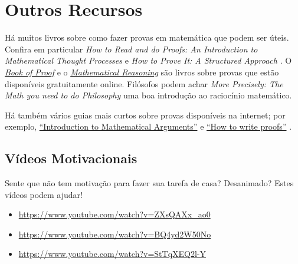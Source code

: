 \documentclass[../../../include/open-logic-section]{subfiles}
\begin{document}

\section{Outros Recursos}

Há muitos livros sobre como fazer provas em matemática que podem ser
úteis. Confira em particular \emph{How to Read and do Proofs: An
Introduction to Mathematical Thought Processes} \citep{Solow2013} e
\emph{How to Prove It: A Structured Approach} \citep{Velleman2019}.  O
\href{http://www.people.vcu.edu/~rhammack/BookOfProof/BookOfProof.pdf}{\emph{Book
of Proof}} \citep{Hammack2013} e o
\href{https://scholarworks.gvsu.edu/books/7/}{\emph{Mathematical
Reasoning}} \citep{Sandstrum2019} são livros sobre provas que estão
disponíveis gratuitamente online.  Filósofos podem achar
\emph{More
Precisely: The Math you need to do Philosophy} \citep{Steinhart2018}
uma boa introdução ao raciocínio matemático.

Há também vários guias mais curtos sobre provas disponíveis na
internet; por exemplo,
\href{https://math.berkeley.edu/~hutching/teach/proofs.pdf}{``Introduction
  to Mathematical Arguments''} \citep{Hutchings2003} e
\href{https://eugeniacheng.com/wp-content/uploads/2017/02/cheng-proofguide.pdf}{``How to
  write proofs''} \citep{Cheng2004}.

\subsection{Vídeos Motivacionais}

Sente que não tem motivação para fazer sua tarefa de casa? Desanimado?
Estes vídeos podem ajudar!

\begin{itemize}
\item \url{https://www.youtube.com/watch?v=ZXsQAXx_ao0}
\item \url{https://www.youtube.com/watch?v=BQ4yd2W50No}
\item \url{https://www.youtube.com/watch?v=StTqXEQ2l-Y}
\end{itemize}
\end{document}
